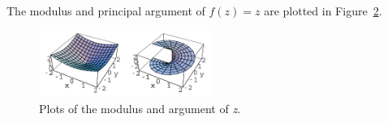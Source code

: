 \begin{Example}
\begin{figure}[htbp!]
    \label{zarg}
  \end{figure}
  The modulus and principal argument of $f(z) = z$ are plotted in 
  Figure~\ref{zma}.
  \begin{figure}[htbp!]
    \begin{center}
        \includegraphics[width=0.5\textwidth]{fcv/function/zma}
    \end{center}
    \caption{Plots of the modulus and argument of \textit{z}.}
    \label{zma}
  \end{figure}
\end{Example}







